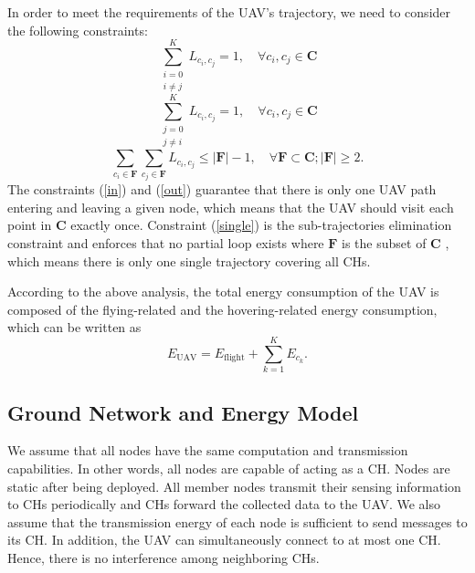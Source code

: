 \documentclass[journal]{IEEEtran}
\begin{document}
	In order to meet the requirements of the UAV's trajectory, we need to consider the following constraints:
	\begin{equation}
	\label{in}
	\sum_{\substack{i=0 \\ i \neq j}}^{K}L_{c_i,c_j} = 1, \quad \forall{c_i, c_j} \in {\bm{C}}
	\end{equation}
	\begin{equation}
	\label{out}
	\sum_{\substack{j=0 \\ j \neq i}}^{K}L_{c_i,c_j} = 1, \quad \forall{c_i, c_j} \in {\bm{C}}
	\end{equation}
	\begin{equation}
	\label{single}
	\sum_{c_i \in {\bm{F}}}\sum_{c_j \in \bm{F}}L_{c_i,c_j} \leq |\bm{F}| - 1,\quad \forall{\bm{F}} \subset \bm{C}; |\bm{F}| \geq 2.
	\end{equation}
	The constraints (\ref{in}) and (\ref{out}) guarantee that there is only one UAV path entering and leaving a given node,  which means that the UAV should visit each point in $\bm{C}$ exactly once. Constraint (\ref{single}) is the sub-trajectories elimination constraint and enforces that no partial loop exists where $\bm{F}$ is the subset of $\bm{C}$ \cite{R. Roberti}, which means there is only one single trajectory covering all CHs.
	
	According to the above analysis, the total energy consumption of the UAV is composed of the flying-related and the hovering-related energy consumption, which can be written as
	\begin{equation}
	\label{uav}
	    E_{\text{UAV}} = E_{\text{flight}} + \sum_{k=1}^{K}E_{c_k}.
	\end{equation}
	
	
	\subsection{Ground Network and Energy Model}
	We assume that all nodes have the same computation and transmission capabilities. In other words, all nodes  are capable of acting as a CH. Nodes are static after being deployed. All member nodes transmit their sensing information to CHs periodically and CHs forward the collected data to the UAV. We also assume that the transmission energy of each node is sufficient to send messages to its CH. In addition, the UAV can simultaneously connect to at most one CH. Hence, there is no interference among neighboring CHs.
	
\end{document}
